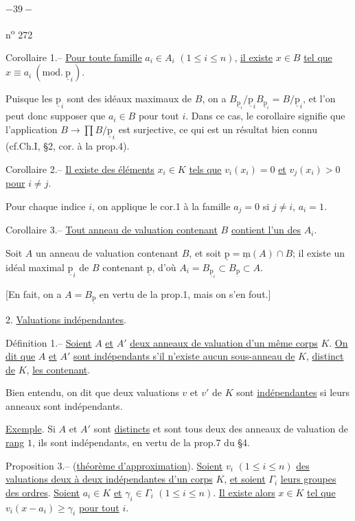 
\begin{center}$-39-$\end{center}\hfill n\textsuperscript{o} 272

Corollaire 1.-- \uline{Pour toute famille} $a_i\in A_i$ $(1\leqslant i\leqslant n)$, \uline{il existe} $x\in B$ \uline{tel que} $x\equiv a_i\ (\mathrm{mod.}\ \underline{\mathrm p}_i)$.

Puisque les $\underline{\mathrm p}_i$ sont des idéaux maximaux de $B$, on a $B_{\underline{\mathrm p}_i}/\underline{\mathrm p}_iB_{\underline{\mathrm p}_i}=B/\underline{\mathrm p}_i$, et l'on peut donc supposer que $a_i\in B$ pour tout $i$. Dans ce cas, le corollaire signifie que l'application $B\longrightarrow\prod B/\underline{\mathrm p}_i$ est surjective, ce qui est un résultat bien connu (cf.Ch.I, \S2, cor. à la prop.4).

Corollaire 2.-- \uline{Il existe des éléments} $x_i\in K$ \uline{tels que} $v_i(x_i)=0$ \uline{et} $v_j(x_i)>0$ \uline{pour} $i\ne j$.

Pour chaque indice $i$, on applique le cor.1 à la famille $a_j=0$ si $j\ne i$, $a_i=1$.

Corollaire 3.-- \uline{Tout anneau de valuation contenant} $B$ \uline{contient l'un des} $A_i$.

Soit $A$ un anneau de valuation contenant $B$, et soit $\underline{\mathrm p}=\underline{\mathrm m}(A)\cap B$; il existe un idéal maximal $\underline{\mathrm p}_i$ de $B$ contenant $\underline{\mathrm p}$, d'où $A_i=B_{\underline{\mathrm p}_i}\subset B_{\underline{\mathrm p}}\subset A$.

[En fait, on a $A=B_{\underline{\mathrm p}}$ en vertu de la prop.1, mais on s'en fout.]

2. \uline{Valuations indépendantes}.

Définition 1.-- \uline{Soient} $A$ \uline{et} $A'$ \uline{deux anneaux de valuation d'un même corps} $K$. \uline{On dit que} $A$ \uline{et} $A'$ \uline{sont indépendants s'il n'existe aucun sous-anneau de} $K$, \uline{distinct de} $K$, \uline{les contenant}.

Bien entendu, on dit que deux valuations $v$ et $v'$ de $K$ sont \uline{indépendantes} si leurs anneaux sont indépendants.

\uline{Exemple}. Si $A$ et $A'$ sont \uline{distincts} et sont tous deux des anneaux de valuation de \uline{rang} $1$, ils sont indépendants, en vertu de la prop.7 du \S4.

Proposition 3.-- (\uline{théorème d'approximation}). \uline{Soient} $v_i$ $(1\leqslant i\leqslant n)$ \uline{des valuations deux à deux indépendantes d'un corps} $K$, \uline{et soient} $\Gamma_i$ \uline{leurs groupes des ordres}. \uline{Soient} $a_i\in K$ \uline{et} $\gamma_i\in\Gamma_i$ $(1\leqslant i\leqslant n)$. \uline{Il existe alors} $x\in K$ \uline{tel que} $v_i(x-a_i)\geqslant\gamma_i$ \uline{pour tout} $i$.
